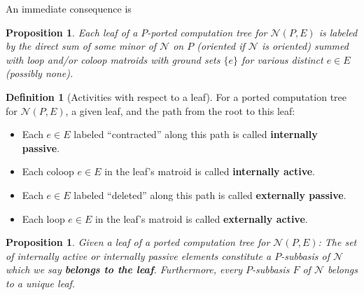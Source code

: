 \documentclass[12pt]{article}
\newtheorem{proposition}[theorem]{Proposition}
\theoremstyle{definition}
\newtheorem{definition}[theorem]{Definition}
\begin{document}
An immediate consequence is
\begin{proposition}
Each leaf of a $P$-ported computation tree for $\mathcal{N}(P,E)$
is labeled by the direct sum of some minor of $\mathcal{N}$ on $P$ 
(oriented if $\mathcal{N}$ is oriented) 
summed with loop and/or coloop matroids with 
ground sets $\{e\}$ for various distinct $e\in E$ (possibly none).
\end{proposition}

\begin{definition}[Activities with respect to a leaf]
\label{ActivityTreeDef}
For a ported computation tree for $\mathcal{N}(P,E)$, 
a given leaf, and the path from the root to this leaf:
\begin{itemize}
\item Each $e\in E$ labeled ``contracted'' along this path
is called \textbf{internally passive}.
\item Each coloop $e\in E$ in the leaf's matroid is
called \textbf{internally active}.
\item Each $e\in E$ labeled ``deleted'' along this path
is called \textbf{externally passive}.
\item Each loop $e\in E$ in the leaf's matroid is
called \textbf{externally active}.
\end{itemize}
\end{definition}

\begin{proposition}
Given a leaf of a ported computation tree for $\mathcal{N}(P,E)$:
The set of internally active or internally passive elements 
constitute a 
$P$-subbasis of $\mathcal{N}$ which we say 
\textbf{belongs to the leaf}.  
Furthermore, every $P$-subbasis $F$ of $\mathcal{N}$ belongs to a unique leaf.
\end{proposition}
\end{document}
